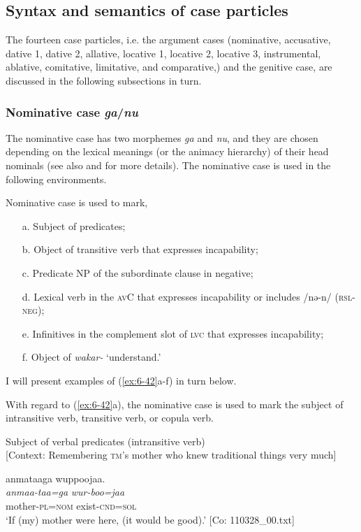 \subsection{Syntax and semantics of case particles}

The fourteen case particles, i.e. the argument cases (nominative, accusative, dative 1, dative 2, allative, locative 1, locative 2, locative 3, instrumental, ablative, comitative, limitative, and comparative,) and the genitive case, are discussed in the following subsections in turn.

\subsubsection{Nominative case \textit{ga}/\textit{nu}}
\label{bkm:Ref366360662}
The nominative case has two morphemes \textit{ga} and \textit{nu}, and they are chosen depending on the lexical meanings (or the animacy hierarchy) of their head nominals (see also  and  for more details). The nominative case is used in the following environments.

\ea\label{ex:6-42}
 Nominative case is used to mark,\\

 \begin{itemize}
\item[a.]   Subject of predicates;
\item[b.] Object of transitive verb that expresses incapability;
\item[c.] Predicate NP of the subordinate clause in negative;
\item[d.] Lexical verb in the \textsc{av}C that expresses incapability or includes /nə-n/ (\textsc{rsl}-\textsc{neg});
\item[e.] Infinitives in the complement slot of \textsc{lvc} that expresses incapability;
\item[f.] Object of \textit{wakar-} ‘understand.’
\end{itemize}
I will present examples of (\ref{ex:6-42}a-f) in turn below.

With regard to (\ref{ex:6-42}a), the nominative case is used to mark the subject of intransitive verb, transitive verb, or copula verb.

\ea\label{ex:6-43}
\ea Subject of verbal predicates (intransitive verb)\\{}
[Context: Remembering \textsc{tm}’s mother who knew traditional things very much]

{\TM}
\glll anmataaga  wuppoojaa.\\
      \textit{anmaa-taa=ga}  \textit{wur-boo=jaa}\\
      mother-\textsc{pl}=\textsc{nom}  exist-\textsc{cnd}=\textsc{sol}\\
\glt ‘If (my) mother were here, (it would be good).’ [Co: 110328\_00.txt]
\z


